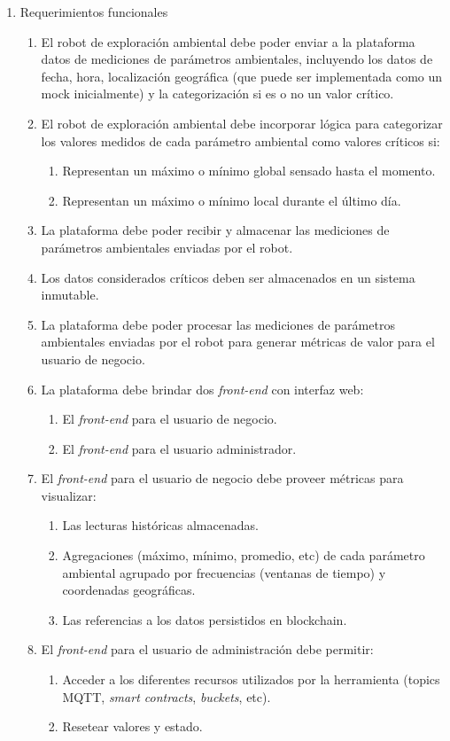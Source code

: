 \documentclass[
11pt, %
]{charter}
\begin{document}
\begin{enumerate}	
	\item Requerimientos funcionales		
	\begin{enumerate}	
		
		\item El robot de exploración ambiental debe poder enviar a la plataforma datos de mediciones de parámetros ambientales, incluyendo los datos de fecha, hora, localización geográfica (que puede ser implementada como un mock inicialmente) y la categorización si es o no un valor crítico.
		\item El robot de exploración ambiental debe incorporar lógica para categorizar los valores medidos de cada parámetro ambiental como valores críticos si:
		\begin{enumerate}				
			\item Representan un máximo o mínimo global sensado hasta el momento.				
			\item Representan un máximo o mínimo local durante el último día.				
		\end{enumerate}			
		\item La plataforma debe poder recibir y almacenar las mediciones de parámetros ambientales enviadas por el robot.
		\item Los datos considerados críticos deben ser almacenados en un sistema inmutable.
		\item La plataforma debe poder procesar las mediciones de parámetros ambientales enviadas por el robot para generar métricas de valor para el usuario de negocio.		
		\item La plataforma debe brindar dos \textit{front-end} con interfaz web:
			\begin{enumerate}				
				\item El \textit{front-end} para el usuario de negocio.				
				\item El \textit{front-end} para el usuario administrador.				
			\end{enumerate}			
		
		\item El \textit{front-end} para el usuario de negocio debe proveer métricas para visualizar:
			\begin{enumerate}				
				\item Las lecturas históricas almacenadas.				
				\item Agregaciones (máximo, mínimo, promedio, etc) de cada parámetro ambiental agrupado por frecuencias (ventanas de tiempo) y coordenadas geográficas.				
				\item Las referencias a los datos persistidos en blockchain.
			\end{enumerate}			
		\item El \textit{front-end} para el usuario de administración debe permitir:
			\begin{enumerate}				
				\item Acceder a los diferentes recursos utilizados por la herramienta (topics MQTT, \textit{smart contracts}, \textit{buckets}, etc).
				\item Resetear valores y estado.			
			\end{enumerate}			
		\end{enumerate}	


\end{enumerate}
\end{document}
